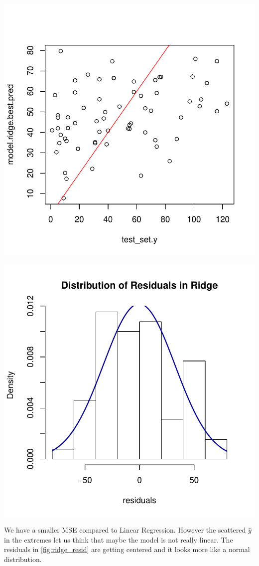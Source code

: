 \documentclass[]{report}
\begin{document}
\begin{center}
	\includegraphics[width=0.8\linewidth]{Figures/ridge_yhat.pdf}
	\label{fig:ridhe_yhat}
\end{center}

\begin{center}
	\includegraphics[width=0.8\linewidth]{Figures/ridge_resid.pdf}
	\label{fig:ridge_resid}
\end{center}

We have a smaller MSE compared to Linear Regression. However the scattered $\hat{y}$ in the extremes let us think that maybe the model is not really linear. The residuals in \ref{fig:ridge_resid} are getting centered and it looks more like a normal distribution.
\end{document}
